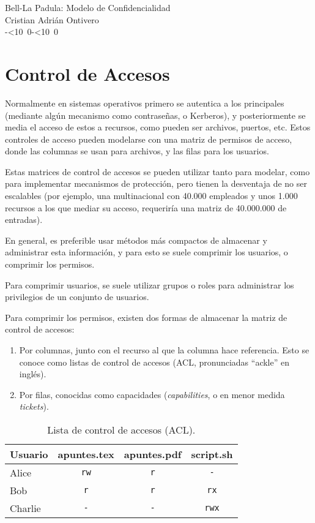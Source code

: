 \documentclass{article}
\theoremstyle{definition}
\def\isodate{\leavevmode\hbox{\the\year-\twodigits\month-\twodigits\day}}
\def\twodigits#1{\ifnum#1<10 0\fi\the#1}
\begin{document}
\begin{center}
  {\LARGE Bell-La Padula: Modelo de Confidencialidad}\\[.2cm]
  Cristian Adrián Ontivero \\[.05cm]%
  \isodate
\end{center}

\vspace{0.2 cm}
\iffalse
\section{Control de Accesos}
Normalmente en sistemas operativos primero se autentica a los principales
(mediante algún mecanismo como contraseñas, o Kerberos), y posteriormente se
media el acceso de estos a recursos, como pueden ser archivos, puertos, etc.
Estos controles de acceso pueden modelarse con una matriz de permisos de acceso,
donde las columnas se usan para archivos, y las filas para los usuarios.

Estas matrices de control de accesos se pueden utilizar tanto para modelar, como
para implementar mecanismos de protección, pero tienen la desventaja de no ser
escalables (por ejemplo, una multinacional con 40.000 empleados y unos 1.000 recursos
a los que mediar su acceso, requeriría una matriz de 40.000.000 de entradas). 

En general, es preferible usar métodos más compactos de almacenar y administrar
esta información, y para esto se suele comprimir los usuarios, o comprimir los
permisos.

Para comprimir usuarios, se suele utilizar grupos o roles para administrar los
privilegios de un conjunto de usuarios.

Para comprimir los permisos, existen dos formas de almacenar la matriz
de control de accesos:
\begin{enumerate}
  \item Por columnas, junto con el recurso al que la columna hace referencia.
    Esto se conoce como listas de control de accesos (ACL, pronunciadas
    ``ackle'' en inglés).
  \item Por filas, conocidas como capacidades (\textit{capabilities}, o en menor
    medida \textit{tickets}).
\end{enumerate}

\begin{table}[h!]
  \centering
\begin{tabular}{l|c|c|c} 
 Usuario & apuntes.tex & apuntes.pdf & script.sh \\ 
 \hline
 Alice   & \verb+rw+   & \verb+r+    & \verb+-+ \\ 
 Bob     & \verb+r+    & \verb+r+    & \verb+rx+ \\ 
 Charlie & \verb+-+    & \verb+-+    & \verb+rwx+ \\
\end{tabular}
\caption{Lista de control de accesos (ACL).}
\end{table}
\end{document}
